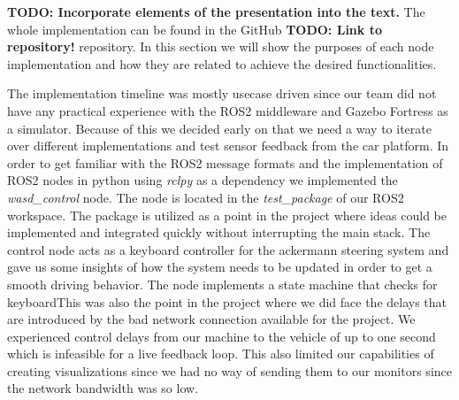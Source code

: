\textbf{TODO: Incorporate elements of the presentation into the text.} The whole implementation can be found in the GitHub 
\textbf{TODO: Link to repository!} repository. In this section we will show the purposes of each node implementation and how they are related to achieve the desired functionalities.


The implementation timeline was mostly usecase driven since our team did not have any practical experience with the ROS2 middleware and Gazebo Fortress as a simulator. Because of this we decided early on that we need a way to iterate over different implementations and test sensor feedback from the car platform. In order to get familiar with the ROS2 message formats and the implementation of ROS2 nodes in python using \textit{rclpy} as a dependency we implemented the \textit{wasd\_control} node. The node is located in the \textit{test\_package} of our ROS2 workspace. The package is utilized as a point in the project where ideas could be implemented and integrated quickly without interrupting the main stack. The control node acts as a keyboard controller for the ackermann steering system and gave us some insights of how the system needs to be updated in order to get a smooth driving behavior. The node implements a state machine that checks for keyboardThis was also the point in the project where we did face the delays that are introduced by the bad network connection available for the project. We experienced control delays from our machine to the vehicle of up to one second which is infeasible for a live feedback loop. This also limited our capabilities of creating visualizations since we had no way of sending them to our monitors since the network bandwidth was so low.


